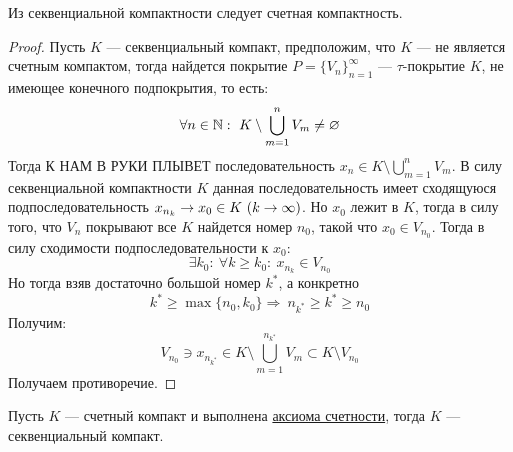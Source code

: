\begin{claim}
	Из секвенциальной компактности следует счетная компактность. 
\end{claim}
\begin{proof}
	Пусть $K$ --- секвенциальный компакт, предположим, что $K$ --- не является счетным компактом, тогда найдется покрытие $P = \{V_n\}_{n=1}^\infty$ --- $\tau$-покрытие $K$, не имеющее конечного подпокрытия, то есть:
	$$
	\forall n \in \mathbb{N}: \ K \setminus \bigcup_{m=1}^n V_m \neq \varnothing 
	$$
	Тогда К НАМ В РУКИ ПЛЫВЕТ последовательность $x_n \in K \setminus \bigcup_{m=1}^nV_m$. В силу секвенциальной компактности $K$ данная последовательность имеет сходящуюся подпоследовательность $x_{n_k} \rightarrow x_0 \in K \ (k \rightarrow \infty)$. Но $x_0$ лежит в $K$, тогда в силу того, что $V_n$ покрывают все $K$ найдется номер $n_0$, такой что $x_0 \in V_{n_0}$. Тогда в силу сходимости подпоследовательности к $x_0$:
	$$
	\exists k_0: \ \forall k \geq k_0: \ x_{n_k} \in V_{n_0}
	$$
	Но тогда взяв достаточно большой номер $k^*$, а конкретно 
	$$
	k^* \geq \max\{n_0, k_0\} \Rightarrow \ n_{k^*} \geq k^* \geq n_0
	$$Получим:
	$$
	V_{n_0} \ni x_{n_{k^*}} \in K \setminus \bigcup_{m=1}^{n_{k^*}}V_m \subset K \setminus V_{n_0}
	$$
	Получаем противоречие. 
\end{proof}
\begin{claim}
	Пусть $K$ --- счетный компакт и выполнена \hyperlink{fcs}{аксиома счетности}, тогда $K$ --- секвенциальный компакт.
\end{claim}
